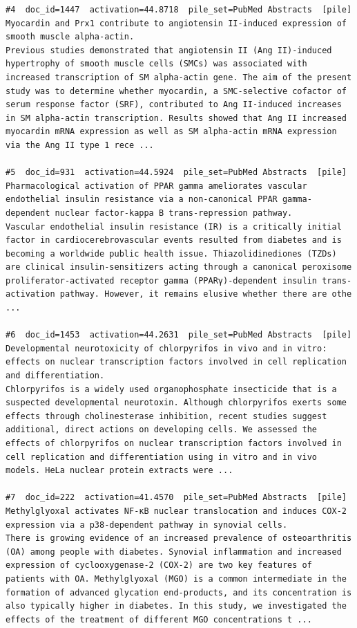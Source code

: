 \begin{verbatim}
#4  doc_id=1447  activation=44.8718  pile_set=PubMed Abstracts  [pile]
Myocardin and Prx1 contribute to angiotensin II-induced expression of smooth muscle alpha-actin.
Previous studies demonstrated that angiotensin II (Ang II)-induced hypertrophy of smooth muscle cells (SMCs) was associated with increased transcription of SM alpha-actin gene. The aim of the present study was to determine whether myocardin, a SMC-selective cofactor of serum response factor (SRF), contributed to Ang II-induced increases in SM alpha-actin transcription. Results showed that Ang II increased myocardin mRNA expression as well as SM alpha-actin mRNA expression via the Ang II type 1 rece ...

#5  doc_id=931  activation=44.5924  pile_set=PubMed Abstracts  [pile]
Pharmacological activation of PPAR gamma ameliorates vascular endothelial insulin resistance via a non-canonical PPAR gamma-dependent nuclear factor-kappa B trans-repression pathway.
Vascular endothelial insulin resistance (IR) is a critically initial factor in cardiocerebrovascular events resulted from diabetes and is becoming a worldwide public health issue. Thiazolidinediones (TZDs) are clinical insulin-sensitizers acting through a canonical peroxisome proliferator-activated receptor gamma (PPARγ)-dependent insulin trans-activation pathway. However, it remains elusive whether there are othe ...

#6  doc_id=1453  activation=44.2631  pile_set=PubMed Abstracts  [pile]
Developmental neurotoxicity of chlorpyrifos in vivo and in vitro: effects on nuclear transcription factors involved in cell replication and differentiation.
Chlorpyrifos is a widely used organophosphate insecticide that is a suspected developmental neurotoxin. Although chlorpyrifos exerts some effects through cholinesterase inhibition, recent studies suggest additional, direct actions on developing cells. We assessed the effects of chlorpyrifos on nuclear transcription factors involved in cell replication and differentiation using in vitro and in vivo models. HeLa nuclear protein extracts were ...

#7  doc_id=222  activation=41.4570  pile_set=PubMed Abstracts  [pile]
Methylglyoxal activates NF-κB nuclear translocation and induces COX-2 expression via a p38-dependent pathway in synovial cells.
There is growing evidence of an increased prevalence of osteoarthritis (OA) among people with diabetes. Synovial inflammation and increased expression of cyclooxygenase-2 (COX-2) are two key features of patients with OA. Methylglyoxal (MGO) is a common intermediate in the formation of advanced glycation end-products, and its concentration is also typically higher in diabetes. In this study, we investigated the effects of the treatment of different MGO concentrations t ...


\end{verbatim}

